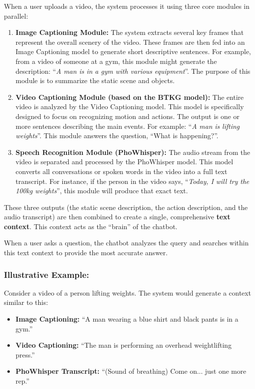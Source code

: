 When a user uploads a video, the system processes it using three core modules in parallel:

\begin{enumerate}
    \item \textbf{Image Captioning Module:} The system extracts several key frames that represent the overall scenery of the video. These frames are then fed into an Image Captioning model to generate short descriptive sentences. For example, from a video of someone at a gym, this module might generate the description: ``\textit{A man is in a gym with various equipment}''. The purpose of this module is to summarize the static scene and objects.
    
    \item \textbf{Video Captioning Module (based on the BTKG model):} The entire video is analyzed by the Video Captioning model. This model is specifically designed to focus on recognizing motion and actions. The output is one or more sentences describing the main events. For example: ``\textit{A man is lifting weights}''. This module answers the question, ``What is happening?''.
    
    \item \textbf{Speech Recognition Module (PhoWhisper):} The audio stream from the video is separated and processed by the PhoWhisper model. This model converts all conversations or spoken words in the video into a full text transcript. For instance, if the person in the video says, ``\textit{Today, I will try the 100kg weights}'', this module will produce that exact text.
\end{enumerate}

These three outputs (the static scene description, the action description, and the audio transcript) are then combined to create a single, comprehensive \textbf{text context}. This context acts as the ``brain'' of the chatbot.

When a user asks a question, the chatbot analyzes the query and searches within this text context to provide the most accurate answer.

\subsubsection*{Illustrative Example:}

Consider a video of a person lifting weights. The system would generate a context similar to this:

\begin{itemize}
    \item \textbf{Image Captioning:} ``A man wearing a blue shirt and black pants is in a gym.''

    \item \textbf{Video Captioning:} ``The man is performing an overhead weightlifting press.''

    \item \textbf{PhoWhisper Transcript:} ``(Sound of breathing) Come on... just one more rep.''
\end{itemize}

